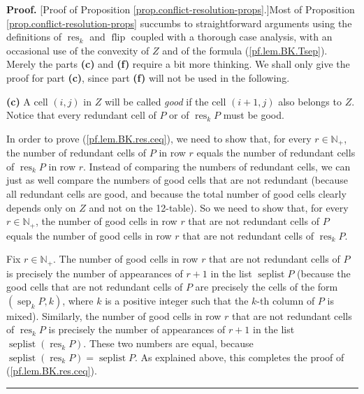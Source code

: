 \documentclass[numbers=enddot,12pt,final,onecolumn,notitlepage]{scrartcl}%
\theoremstyle{definition}
\newenvironment{proof}[1][Proof]{\noindent\textbf{#1.} }{\ \rule{0.5em}{0.5em}}
\newenvironment{vershort}{}{}
\begin{document}
\begin{vershort}
\begin{proof}
[Proof of Proposition \ref{prop.conflict-resolution-props}.]Most of
Proposition \ref{prop.conflict-resolution-props} succumbs to straightforward
arguments using the definitions of $\operatorname*{res}_{k}$ and
$\operatorname*{flip}$ coupled with a thorough case analysis, with an
occasional use of the convexity of $Z$ and of the formula
(\ref{pf.lem.BK.Tsep}). Merely the parts \textbf{(c)} and \textbf{(f)} require
a bit more thinking. We shall only give the proof for part \textbf{(c)}, since
part \textbf{(f)} will not be used in the following.

\textbf{(c)} A cell $\left(  i,j\right)  $ in $Z$ will be called \textit{good}
if the cell $\left(  i+1,j\right)  $ also belongs to $Z$. Notice that every
redundant cell of $P$ or of $\operatorname*{res}\nolimits_{k}P$ must be good.

In order to prove (\ref{pf.lem.BK.res.ceq}), we need to show that, for every
$r\in\mathbb{N}_{+}$, the number of redundant cells of $P$ in row $r$ equals
the number of redundant cells of $\operatorname*{res}\nolimits_{k}P$ in row
$r$. Instead of comparing the numbers of redundant cells, we can just as well
compare the numbers of good cells that are not redundant (because all redundant
cells are good, and because the total number of good cells clearly depends
only on $Z$ and not on the 12-table). So we need to show that, for every
$r\in\mathbb{N}_{+}$, the number of good cells in row $r$ that are not
redundant cells of $P$ equals the number of good cells in row $r$ that are not
redundant cells of $\operatorname*{res}\nolimits_{k}P$.

Fix $r\in\mathbb{N}_{+}$. The number of good cells in row $r$ that are not
redundant cells of $P$ is precisely the number of appearances of $r+1$ in the
list $\operatorname*{seplist}P$ (because the good cells that are not redundant
cells of $P$ are precisely the cells of the form $\left(  \operatorname*{sep}%
\nolimits_{k}P,k\right)  $, where $k$ is a positive integer such that the
$k$-th column of $P$ is mixed). Similarly, the number of good cells in row $r$
that are not redundant cells of $\operatorname*{res}\nolimits_{k}P$ is
precisely the number of appearances of $r+1$ in the list
$\operatorname*{seplist}\left(  \operatorname*{res}\nolimits_{k}P\right)  $.
These two numbers are equal, because $\operatorname*{seplist}\left(
\operatorname*{res}\nolimits_{k}P\right)  =\operatorname*{seplist}P$. As
explained above, this completes the proof of (\ref{pf.lem.BK.res.ceq}).
\end{proof}
\end{vershort}
\end{document}
